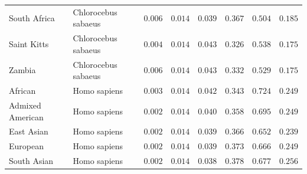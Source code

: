 \documentclass{article}
\begin{document}
\begin{center}
\begin{longtable*}{|l|l|r|r|r|r|r|r|}
            South Africa & Chlorocebus sabaeus &               $ 0.006$ &          $ 0.014$ &                   $ 0.039$ &                                          $ 0.367$ &                         $ 0.504$ &                      $ 0.185$ \\
            Saint Kitts & Chlorocebus sabaeus &               $ 0.004$ &          $ 0.014$ &                   $ 0.043$ &                                          $ 0.326$ &                         $ 0.538$ &                      $ 0.175$ \\
            Zambia & Chlorocebus sabaeus &               $ 0.006$ &          $ 0.014$ &                   $ 0.043$ &                                          $ 0.332$ &                         $ 0.529$ &                      $ 0.175$ \\
            African &        Homo sapiens &               $ 0.003$ &          $ 0.014$ &                   $ 0.042$ &                                          $ 0.343$ &                         $ 0.724$ &                      $ 0.249$ \\
            Admixed American &        Homo sapiens &               $ 0.002$ &          $ 0.014$ &                   $ 0.040$ &                                          $ 0.358$ &                         $ 0.695$ &                      $ 0.249$ \\
            East Asian &        Homo sapiens &               $ 0.002$ &          $ 0.014$ &                   $ 0.039$ &                                          $ 0.366$ &                         $ 0.652$ &                      $ 0.239$ \\
            European &        Homo sapiens &               $ 0.002$ &          $ 0.014$ &                   $ 0.039$ &                                          $ 0.373$ &                         $ 0.666$ &                      $ 0.249$ \\
            South Asian &        Homo sapiens &               $ 0.002$ &          $ 0.014$ &                   $ 0.038$ &                                          $ 0.378$ &                         $ 0.677$ &                      $ 0.256$ \\
        \end{longtable*}
    \end{center}
\end{document}
